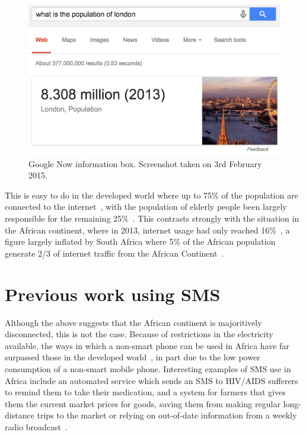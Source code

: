 \documentclass[authoryearcitations]{UoYCSproject}
\begin{document}
\begin{figure}[htb] 
\includegraphics[width=\linewidth]{googleInstant}
\caption{Google Now information box.  Screenshot taken on 3rd February 2015.}
\label{fig:googleInstant}
\end{figure}

This is easy to do in the developed world where up to 75\% of the population are connected to the internet~\cite{ITU_Cell_Usage_2013}, with the population of elderly people been largely responsible for the remaining 25\%~\cite{Gov_Internet_Usage_UK_2014}.  This contrasts strongly with the situation in the African continent, where in 2013, internet usage had only reached 16\%~\cite{ITU_Cell_Usage_2013}, a figure largely inflated by South Africa where 5\% of the African population generate 2/3 of internet traffic from the African Continent~\cite{ITU_Cell_Usage_2013}.

\section{Previous work using SMS}
Although the above suggests that the African continent is majoritively disconnected, this is not the case.  Because of restrictions in the electricity available, the ways in which a non-smart phone  can be used in Africa have far surpassed those in the developed world~\cite{Fox:2011:Online}, in part due to the low power consumption of a non-smart mobile phone.  Interesting examples of SMS use in Africa include an automated service which sends an SMS to HIV/AIDS sufferers to remind them to take their medication, and a system for farmers that gives them the current market prices for goods, saving them from making regular long-distance trips to the market or relying on out-of-date information from a weekly radio broadcast~\cite{Aker_Mobile_Phones_2010}.
\end{document}
